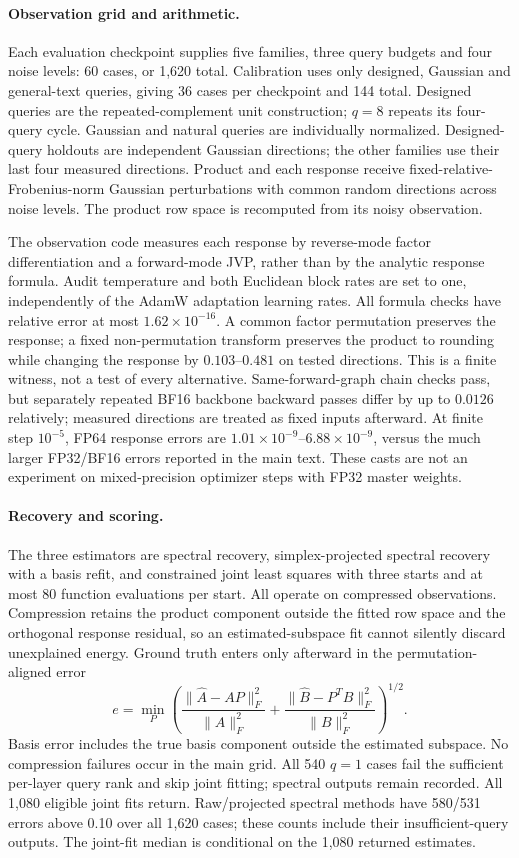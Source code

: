 \paragraph{Observation grid and arithmetic.}
Each evaluation checkpoint supplies five families, three query budgets and
 four noise levels: 60 cases, or 1,620 total. Calibration uses only designed,
Gaussian and general-text queries, giving 36 cases per checkpoint and 144
 total. Designed queries are the repeated-complement unit construction;
$q=8$ repeats its four-query cycle. Gaussian and natural queries are
 individually normalized. Designed-query holdouts are independent Gaussian
 directions; the other families use their last four measured directions.
Product and each response receive fixed-relative-Frobenius-norm Gaussian
 perturbations with common random directions across noise levels.
The product row space is recomputed from its noisy observation.

The observation code measures each response by reverse-mode factor
 differentiation and a forward-mode JVP, rather than by the analytic
 response formula. Audit temperature and both Euclidean block rates are
 set to one, independently of the AdamW adaptation learning rates.
All formula checks have relative error at most
$1.62\times10^{-16}$. A common factor permutation preserves the response;
 a fixed non-permutation transform preserves the product to rounding while
 changing the response by $0.103$--$0.481$ on tested directions. This is a
 finite witness, not a test of every alternative. Same-forward-graph chain
 checks pass, but separately repeated BF16 backbone backward passes differ
 by up to $0.0126$ relatively; measured directions are treated as fixed
 inputs afterward. At finite step $10^{-5}$, FP64 response errors are
$1.01\times10^{-9}$--$6.88\times10^{-9}$, versus the much larger FP32/BF16
 errors reported in the main text. These casts are not an experiment on
 mixed-precision optimizer steps with FP32 master weights.

\paragraph{Recovery and scoring.}
The three estimators are spectral recovery, simplex-projected spectral
 recovery with a basis refit, and constrained joint least squares with
 three starts and at most 80 function evaluations per start. All operate
 on compressed observations. Compression retains the product component
 outside the fitted row space and the orthogonal response residual, so an
 estimated-subspace fit cannot silently discard unexplained energy.
Ground truth enters only afterward in the permutation-aligned error
\[
 e=\min_P\left(\frac{\|\widehat A-AP\|_F^2}{\|A\|_F^2}
 +\frac{\|\widehat B-P^TB\|_F^2}{\|B\|_F^2}\right)^{1/2}.
\]
Basis error includes the true basis component outside the estimated
 subspace. No compression failures occur in the main grid. All 540
$q=1$ cases fail the sufficient per-layer query rank and skip joint fitting;
 spectral outputs remain recorded. All 1,080 eligible joint fits return.
Raw/projected spectral methods have 580/531 errors above 0.10 over all
1,620 cases; these counts include their insufficient-query outputs.
The joint-fit median is conditional on the 1,080 returned estimates.

